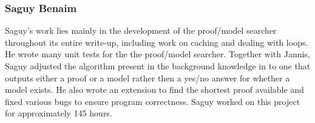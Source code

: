 \subsubsection*{Saguy Benaim}

Saguy's work lies mainly in the development of the proof/model searcher throughout its entire write-up, including work on caching and dealing with loops. He wrote many unit tests for the the proof/model searcher. Together with Jannis, Saguy adjusted the algorithm present in the background knowledge in \cite{gore07} to one that outputs either a proof or a model rather then a yes/no answer for whether a model exists. He also wrote an extension to find the shortest proof available and fixed various bugs to ensure program correctness. Saguy worked on this project for approximately 145 hours. 

